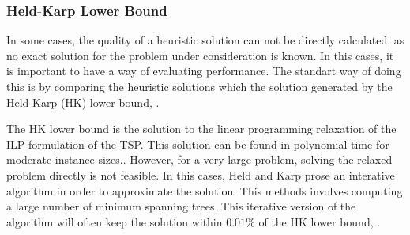 
\subsubsection{Held-Karp Lower Bound}

In some cases, the quality of a heuristic solution can not be directly calculated,
as no exact solution for the problem under consideration is known.
In this cases, it is important to have a way of evaluating performance.
The standart way of doing this is by comparing the heuristic solutions
which the solution generated by the Held-Karp (HK) lower bound, \cite{held_karp_lb}.

The HK lower bound is the solution to the linear programming relaxation of
the ILP formulation of the TSP. This solution can be found in polynomial time for moderate instance sizes..
However, for a very large problem,
solving the relaxed problem directly is not feasible. In this cases, Held and Karp
prose an interative algorithm in order to approximate the solution. This methods
involves computing a large number of minimum spanning trees.
This iterative version of the algorithm will often keep the solution
within $0.01\%$ of the HK lower bound, \cite{heuristics_tsp}.
